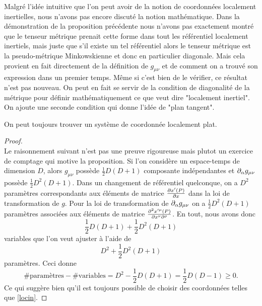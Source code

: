 \documentclass[a4paper,11pt]{report}
\begin{document}
            Malgré l'idée intuitive que l'on peut avoir de la notion de coordonnées localement inertielles, nous n'avons pas encore discuté la notion mathématique. Dans la démonstration de la proposition précédente nous n'avons pas exactement montré que le tenseur métrique prenait cette forme dans tout les référentiel localement inertiels, mais juste que s'il existe un tel référentiel alors le tenseur métrique est la pseudo-métrique Minkowskienne et donc en particulier diagonale. Mais cela provient en fait directement de la définition de $g_{\mu\nu}$ et de comment on a trouvé son expression dans un premier temps. Même si c'est bien de le vérifier, ce résultat n'est pas nouveau. On peut en fait se servir de la condition de diagonalité de la métrique pour définir mathématiquement ce que veut dire "localement inertiel". On ajoute une seconde condition qui donne l'idée de "plan tangent".
            
            \begin{prop}\begin{leftbar}
                On peut toujours trouver un système de coordonnée localement plat.
            \end{leftbar}\end{prop}
            
            \begin{proof}
            ${}$\\
                Le raisonnement suivant n'est pas une preuve rigoureuse mais plutot un exercice de comptage qui motive la proposition. Si l'on considère un espace-temps de dimension $D$, alors $g_{\mu\nu}$ possède $\frac{1}{2}D(D+1)$ composante indépendantes et $\partial_\alpha g_{\mu\nu}$ possède $\frac{1}{2}D^2(D+1)$. Dans un changement de référentiel quelconque, on a $D^2$ paramètres correspondants aux éléments de matrice $\frac{\partial x'(P)}{\partial x}$ dans la loi de transformation de $g$. Pour la loi de transformation de $\partial_\alpha g_{\mu\nu}$ on a $\frac{1}{2}D^2(D+1)$ paramètres associées aux éléments de matrice $\frac{\partial^2 x'^\mu(P)}{\partial x^\nu\partial^\rho}$. En tout, nous avons donc
                \begin{equation}
                    \frac{1}{2}D(D+1)+\frac{1}{2}D^2(D+1)
                \end{equation}
                variables que l'on veut ajuster à l'aide de
                \begin{equation}
                    D^2+\frac{1}{2}D^2(D+1)
                \end{equation}
                paramètres. Ceci donne
                \begin{equation}
                    \#\text{paramètres}-\#\text{variables} = D^2-\frac{1}{2}D(D+1) = \frac{1}{2}D(D-1)\geq0.
                \end{equation}
                Ce qui suggère bien qu'il est toujours possible de choisir des coordonnées telles que \ref{locin}.
            \end{proof}
            
\end{document}

